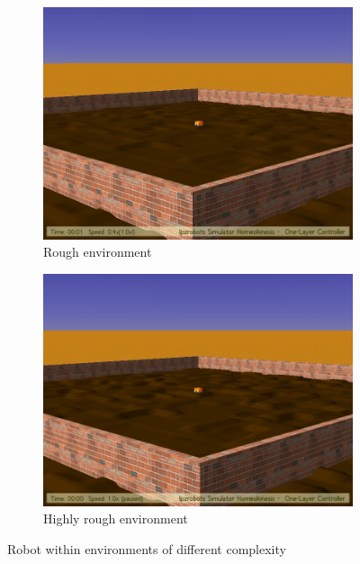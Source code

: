 \documentclass[msc,ai,logo]{infthesis}
\begin{document}
\begin{figure}[H]
\begin{subfigure}[b]{0.45\textwidth}
                \label{fig:tiger}
        \end{subfigure}
        ~ %
        \begin{subfigure}[b]{0.45\textwidth}
                \centering
                \includegraphics[width=\textwidth]{env10.jpg}
                \caption{Rough environment}
                \label{fig:env10}
        \end{subfigure}
\begin{subfigure}[b]{0.45\textwidth}
                \centering
                \includegraphics[width=\textwidth]{env15.jpg}
                \caption{Highly rough environment}
                \label{fig:mouse}
        \end{subfigure}
        \caption{Robot within environments of different complexity}\label{fig:envir}
\end{figure}
\end{document}
